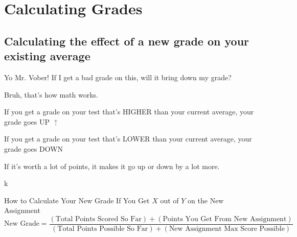 \documentclass[../main.tex]{subfiles}
\begin{document}
\chapter{Calculating Grades}

\section{Calculating the effect of a new grade on your existing average}

\begin{tcolorbox}[colback=white,]

	\begin{rightbubbles}
	Yo Mr. Vober! If I get a bad grade on this, will it bring down my grade?
	\end{rightbubbles}

	\begin{leftbubbles}
	Bruh, that's how math works.

	If you get a grade on your test that's HIGHER than your current average, your grade goes UP \textbf{\textcolor{ForestGreen}{$\uparrow$}}

	If you get a grade on your test that's LOWER than your current average, your grade goes DOWN \textbf{\dracRed{$\downarrow$}}

	If it's worth a lot of points, it makes it go up or down by a lot more.
	\end{leftbubbles}

	\begin{rightbubbles}
	k
	\end{rightbubbles}

\end{tcolorbox}

\begin{boxBoxTitle}{How to Calculate Your New Grade If You Get $X$ out of $Y$ on the New Assignment}
	\begin{equation}
		\text{New Grade} = \frac{(\text{Total Points Scored So Far})+(\text{Points You Get From New Assignment})}{(\text{Total Points Possible So Far})+(\text{New Assignment Max Score Possible})}
	\end{equation}
\end{boxBoxTitle}
\end{document}
